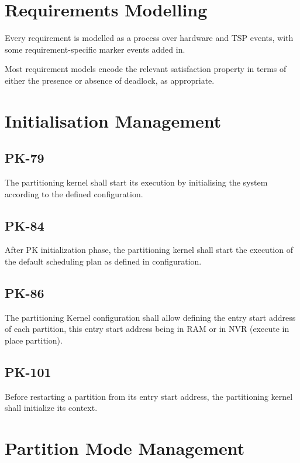 \section{Requirements Modelling} %

 Every requirement is modelled as a process over hardware and TSP events,
 with some requirement-specific marker events added in.

 Most requirement models encode the relevant satisfaction property in terms
 of either the presence or absence of deadlock, as appropriate.




\section{Initialisation Management} %

\subsection{PK-79}
The partitioning kernel shall start its execution by initialising the system according to the defined configuration.

\subsection{PK-84}
After PK initialization phase, the partitioning kernel shall start the execution of the default scheduling plan as defined in configuration.

\subsection{PK-86}
The partitioning Kernel configuration shall allow defining the entry start address of each partition, this entry start address being in RAM or in NVR (execute in place partition).

\subsection{PK-101}
Before restarting a partition from its entry start address, the partitioning kernel shall initialize its context.

\section{Partition Mode Management} %

